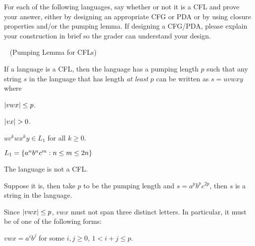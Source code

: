 \begin{problem}
  For each of the following languages, say whether or not it is a CFL
  and prove your answer, either by designing an appropriate CFG or PDA
  or by using closure properties and/or the pumping lemma.
  If designing a CFG/PDA, please explain your construction in brief
  so the grader can understand your design.

  \bigskip
  \begin{blockcolor}
    \begin{lemma}~\label{lemma:pl} (Pumping Lemma for CFLs)

      \step
      If a language is a CFL, then the language
      has a pumping length $p$ such that any string $s$ in the language
      that has length \emph{at least} $p$ can be written
      as $s = uvwxy$ where
      \begin{enumroman}
        \item $\lvert vwx\rvert \leq p$.
        \item $\lvert vx\rvert > 0$.
        \item $uv^kwx^ky \in L_1$ for all $k \geq 0$.
      \end{enumroman}
    \end{lemma}
  \end{blockcolor}

  \begin{enumalph}
    \newpage
    \item $L_1 = \left\{a^nb^nc^m : n \le m \le 2n\right\}$
    \begin{Answer}
      The language is not a CFL.

      \step
      Suppose it is, then take $p$ to be the pumping length
      and $s = a^pb^pc^{2p}$, then $s$ is a string in the language.
      
      Since $\lvert vwx\rvert \leq p$, $vwx$ must not span three distinct letters.
      In particular, it must be of one of the following forms:
      \begin{enumroman}
        \item $vwx = a^ib^j$ for some $i, j \geq 0$, $1 < i + j \leq p$.


\end{enumroman}
\end{Answer}
\end{enumalph}
\end{problem}
